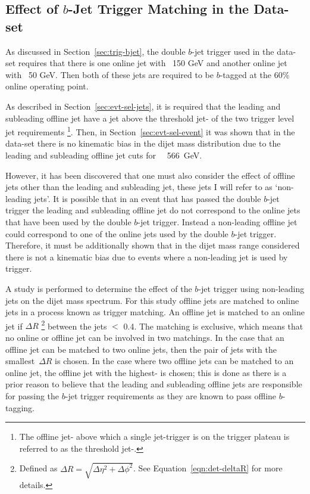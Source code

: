 \newpage
\subsection{Effect of $b$-Jet Trigger Matching in the \lm{} Data-set}
\label{sec:evt-sel_btrigMatch}

As discussed in Section~\ref{sec:trig-bjet},
the double $b$-jet trigger used in the \lm{} data-set
requires that there is one online jet with \pT{} \gt~150 GeV
and another online jet with \pT{} \gt~50 GeV.
Then both of these jets are required to be $b$-tagged at the 60\% online operating point.

As described in Section~\ref{sec:evt-sel-jets}, it is required that the leading and subleading offline jet have a jet \pT{} above
the threshold jet-\pT{} of the two trigger level jet requirements
\footnote{The offline jet-\pT{} above which a single jet-trigger is on the trigger plateau is referred to as the threshold jet-\pT.}.
Then, in Section~\ref{sec:evt-sel-event} it was shown that in the \lm{} data-set
there is no kinematic bias in the dijet mass distribution due to the leading and subleading offline jet \pT{} cuts for \mjj{}~\gt{}~566~GeV.

However, it has been discovered that one must also consider the effect of offline jets other than the leading and subleading jet,
these jets I will refer to as `non-leading jets'.
It is possible that in an event that has passed the double $b$-jet trigger the
leading and subleading offline jet do not correspond to the
online jets that have been used by the double $b$-jet trigger.
Instead a non-leading offline jet could correspond to one of the online jets used by the double $b$-jet trigger.
Therefore, it must be additionally shown that in the dijet mass range considered there is not a kinematic bias
due to events where a non-leading jet is used by trigger.

A study is performed to determine the effect of the $b$-jet trigger using non-leading jets on the dijet mass spectrum.
For this study offline jets are matched to online jets in a process known as trigger matching.
An offline jet is matched to an online jet if $\Delta R$
\footnote{Defined as $\Delta R = \sqrt{\Delta\eta^{2} + \Delta\phi^{2}}$. See Equation~\ref{eqn:det-deltaR} for more details.}
between the jets $<$ 0.4.
The matching is exclusive, which means that no online or offline jet can be involved in two matchings.
In the case that an offline jet can be matched to two online jets, then the pair of jets with the smallest~$\Delta R$ is chosen.
In the case where two offline jets can be matched to an online jet, the offline jet with the highest-\pT{} is chosen;
this is done as there is a prior reason to believe that the leading and subleading offline jets are responsible
for passing the $b$-jet trigger requirements as they are known to pass offline $b$-tagging.

